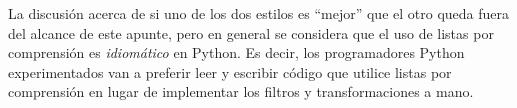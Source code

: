 \begin{subappendices}
La discusión acerca de si uno de los dos estilos es ``mejor'' que el otro queda
fuera del alcance de este apunte, pero en general se considera que el uso de
listas por comprensión es \emph{idiomático} en Python. Es decir, los
programadores Python experimentados van a preferir leer y escribir código que
utilice listas por comprensión en lugar de implementar los filtros y
transformaciones a mano.
\end{subappendices}
